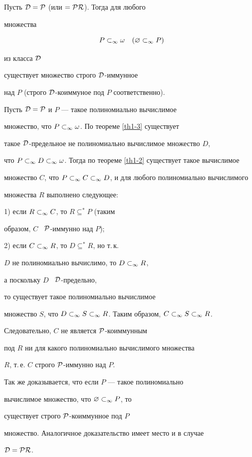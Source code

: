 \begin{cor}\label{cor1}


Пусть $\cal{D}=\cal{P}$ (или $=\cal{PR}$). Тогда для любого


множества


$$


\sub P{\omega} \quad (\sub{\varnothing}P)


$$


из класса $\cal{D}$


существует множество строго $\cal{D}$-иммунное


над $P$ (строго $\cal{D}$-коиммуное под $P$ соответственно).


\end{cor}





\begin{pf}


Пусть $\cal{D}=\cal{P}$ и $P$ --- такое полиномиально вычислимое


множество, что ${P}\subset_\infty{\omega}$. По теореме \ref{th1-3} существует


такое $\cal{D}$-предельное не полиномиально вычислимое множество $D$,


что ${P}\subset_\infty{{D}\subset_\infty{\omega}}$. Тогда по теореме \ref{th1-2} существует такое вычислимое


множество $C$, что ${P}\subset_\infty{{C}\subset_\infty{D}}$, и для любого полиномиально вычислимого


множества $R$ выполнено следующее:





1) если ${R}\subset_\infty{C}$, то $R\subseteq^*P$ (таким


образом, $C$ \ $\cal{P}$-иммунно над $P$);





2) если ${C}\subset_\infty{R}$, то $D\subseteq^* R$, но т.\,к.


$D$ не полиномиально вычислимо, то ${D}\subset_\infty{R}$,


а поскольку $D$ \ $\cal{D}$-предельно,


то существует такое полиномиально вычислимое


множество $S$, что ${D}\subset_\infty{{S}\subset_\infty{R}}$. Таким образом, ${C}\subset_\infty{{S}\subset_\infty{R}}$.


Следовательно, $C$ не является $\cal{P}$-коиммунным


под $R$ ни для какого полиномиально вычислимого множества


$R$, т.\,е. $C$ строго $\cal{P}$-иммунно над $P$.





Так же доказывается, что если $P$ --- такое полиномиально


вычислимое множество, что \linebreak ${\varnothing}\subset_\infty{P}$, то


существует строго $\cal{P}$-коиммунное под $P$


множество. Аналогичное доказательство имеет место и в случае


$\cal{D}=\cal{PR}$.


\end{pf}

